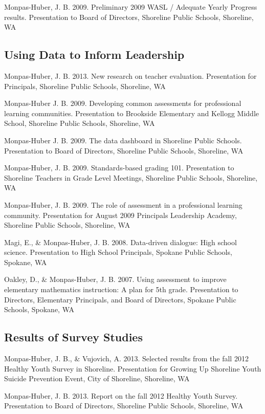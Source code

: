 \documentclass[
  letterpaper,
]{article}
\begin{document}
Monpas-Huber, J. B. 2009. Preliminary 2009 WASL / Adequate Yearly
Progress results. Presentation to Board of Directors, Shoreline Public
Schools, Shoreline, WA

\subsection{Using Data to Inform
Leadership}\label{using-data-to-inform-leadership}

Monpas-Huber, J. B. 2013. New research on teacher evaluation.
Presentation for Principals, Shoreline Public Schools, Shoreline, WA

Monpas-Huber J. B. 2009. Developing common assessments for professional
learning communities. Presentation to Brookside Elementary and Kellogg
Middle School, Shoreline Public Schools, Shoreline, WA

Monpas-Huber J. B. 2009. The data dashboard in Shoreline Public Schools.
Presentation to Board of Directors, Shoreline Public Schools, Shoreline,
WA

Monpas-Huber, J. B. 2009. Standards-based grading 101. Presentation to
Shoreline Teachers in Grade Level Meetings, Shoreline Public Schools,
Shoreline, WA

Monpas-Huber, J. B. 2009. The role of assessment in a professional
learning community. Presentation for August 2009 Principals Leadership
Academy, Shoreline Public Schools, Shoreline, WA

Magi, E., \& Monpas-Huber, J. B. 2008. Data-driven dialogue: High school
science. Presentation to High School Principals, Spokane Public Schools,
Spokane, WA

Oakley, D., \& Monpas-Huber, J. B. 2007. Using assessment to improve
elementary mathematics instruction: A plan for 5th grade. Presentation
to Directors, Elementary Principals, and Board of Directors, Spokane
Public Schools, Spokane, WA

\subsection{Results of Survey Studies}\label{results-of-survey-studies}

Monpas-Huber, J. B., \& Vujovich, A. 2013. Selected results from the
fall 2012 Healthy Youth Survey in Shoreline. Presentation for Growing Up
Shoreline Youth Suicide Prevention Event, City of Shoreline, Shoreline,
WA

Monpas-Huber, J. B. 2013. Report on the fall 2012 Healthy Youth Survey.
Presentation to Board of Directors, Shoreline Public Schools, Shoreline,
WA
\end{document}
